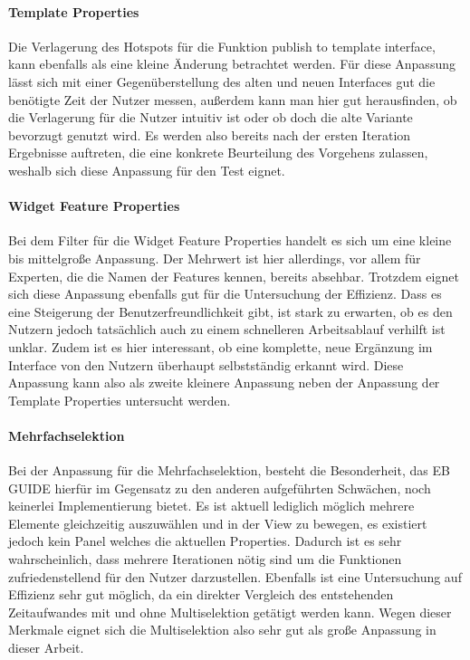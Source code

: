 \paragraph{Template Properties}
Die Verlagerung des Hotspots für die Funktion \glqq publish to template interface\grqq{}, kann ebenfalls als eine kleine Änderung betrachtet werden.
Für diese Anpassung lässt sich mit einer Gegenüberstellung des alten und neuen Interfaces gut die benötigte Zeit der Nutzer messen, außerdem kann man hier gut herausfinden, ob die Verlagerung für die Nutzer intuitiv ist oder ob doch die alte Variante bevorzugt genutzt wird.
Es werden also bereits nach der ersten Iteration Ergebnisse auftreten, die eine konkrete Beurteilung des Vorgehens zulassen, weshalb sich diese Anpassung für den Test eignet.

\paragraph{Widget Feature Properties}
Bei dem Filter für die Widget Feature Properties handelt es sich um eine kleine bis mittelgroße Anpassung.
Der Mehrwert ist hier allerdings, vor allem für Experten, die die Namen der Features kennen, bereits absehbar.
Trotzdem eignet sich diese Anpassung ebenfalls gut für die Untersuchung der Effizienz.
Dass es eine Steigerung der Benutzerfreundlichkeit gibt, ist stark zu erwarten, ob es den Nutzern jedoch tatsächlich auch zu einem schnelleren Arbeitsablauf verhilft ist unklar.
Zudem ist es hier interessant, ob eine komplette, neue Ergänzung im Interface von den Nutzern überhaupt selbstständig erkannt wird.
Diese Anpassung kann also als zweite kleinere Anpassung neben der Anpassung der Template Properties untersucht werden.

\paragraph{Mehrfachselektion}
Bei der Anpassung für die Mehrfachselektion, besteht die Besonderheit, das EB GUIDE hierfür im Gegensatz zu den anderen aufgeführten Schwächen, noch keinerlei Implementierung bietet.
Es ist aktuell lediglich möglich mehrere Elemente gleichzeitig auszuwählen und in der View zu bewegen, es existiert jedoch kein Panel welches die aktuellen Properties.
Dadurch ist es sehr wahrscheinlich, dass mehrere Iterationen nötig sind um die Funktionen zufriedenstellend für den Nutzer darzustellen.
Ebenfalls ist eine Untersuchung auf Effizienz sehr gut möglich, da ein direkter Vergleich des entstehenden Zeitaufwandes mit und ohne Multiselektion getätigt werden kann.
Wegen dieser Merkmale eignet sich die Multiselektion also sehr gut als große Anpassung in dieser Arbeit.


